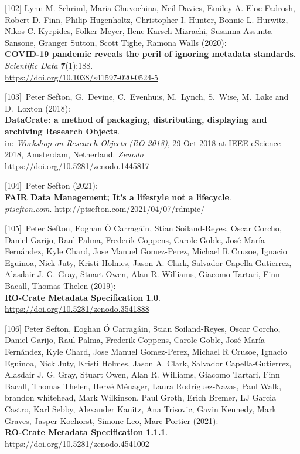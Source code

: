 {[}102{]} Lynn M. Schriml, Maria Chuvochina, Neil Davies, Emiley A.
Eloe-Fadrosh, Robert D. Finn, Philip Hugenholtz, Christopher I. Hunter,
Bonnie L. Hurwitz, Nikos C. Kyrpides, Folker Meyer, Ilene Karsch
Mizrachi, Susanna-Assunta Sansone, Granger Sutton, Scott Tighe, Ramona
Walls (2020):\\
\textbf{COVID-19 pandemic reveals the peril of ignoring metadata
standards}.\\
\emph{Scientific Data} \textbf{7}(1):188.\\
\url{https://doi.org/10.1038/s41597-020-0524-5}

{[}103{]}~Peter Sefton, G.~Devine, C.~Evenhuis, M.~Lynch, S.~Wise,
M.~Lake and D.~Loxton (2018):\\
\textbf{DataCrate: a method of packaging, distributing, displaying and
archiving Research Objects}.\\
in: \emph{Workshop on Research Objects (RO 2018)}, 29 Oct 2018 at IEEE
eScience 2018, Amsterdam, Netherland. \emph{Zenodo}\\
\url{https://doi.org/10.5281/zenodo.1445817}

{[}104{]}~Peter Sefton (2021):\\
\textbf{FAIR Data Management; It's a lifestyle not a lifecycle}.\\
\emph{ptsefton.com}. \url{http://ptsefton.com/2021/04/07/rdmpic/}

{[}105{]}~Peter Sefton, Eoghan Ó Carragáin, Stian Soiland-Reyes, Oscar
Corcho, Daniel Garijo, Raul Palma, Frederik Coppens, Carole Goble, José
María Fernández, Kyle Chard, Jose Manuel Gomez-Perez, Michael R Crusoe,
Ignacio Eguinoa, Nick Juty, Kristi Holmes, Jason A. Clark, Salvador
Capella-Gutierrez, Alasdair J. G. Gray, Stuart Owen, Alan R. Williams,
Giacomo Tartari, Finn Bacall, Thomas Thelen (2019):\\
\textbf{RO-Crate Metadata Specification 1.0}.\\
\url{https://doi.org/10.5281/zenodo.3541888}

{[}106{]} Peter Sefton, Eoghan Ó Carragáin, Stian Soiland-Reyes, Oscar
Corcho, Daniel Garijo, Raul Palma, Frederik Coppens, Carole Goble, José
María Fernández, Kyle Chard, Jose Manuel Gomez-Perez, Michael R Crusoe,
Ignacio Eguinoa, Nick Juty, Kristi Holmes, Jason A. Clark, Salvador
Capella-Gutierrez, Alasdair J. G. Gray, Stuart Owen, Alan R. Williams,
Giacomo Tartari, Finn Bacall, Thomas Thelen, Hervé Ménager, Laura
Rodríguez-Navas, Paul Walk, brandon whitehead, Mark Wilkinson, Paul
Groth, Erich Bremer, LJ Garcia Castro, Karl Sebby, Alexander Kanitz, Ana
Trisovic, Gavin Kennedy, Mark Graves, Jasper Koehorst, Simone Leo, Marc
Portier (2021):\\
\textbf{RO-Crate Metadata Specification 1.1.1}.\\
\url{https://doi.org/10.5281/zenodo.4541002}

